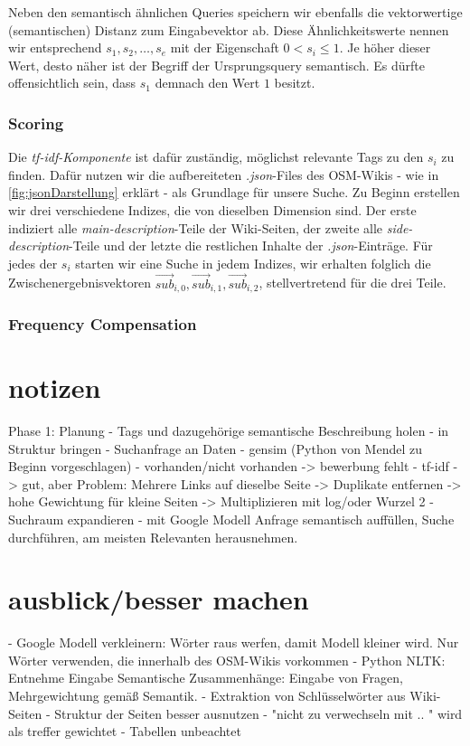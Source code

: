 \documentclass[12pt,pdftex,a4paper]{article}
\begin{document}
Neben den semantisch ähnlichen Queries speichern wir ebenfalls die vektorwertige (semantischen) Distanz zum Eingabevektor ab. Diese Ähnlichkeitswerte nennen wir entsprechend  $s_1, s_2, \dots, s_e$ mit der Eigenschaft $0 < s_i \leq 1$. Je höher dieser Wert, desto näher ist der Begriff der Ursprungsquery semantisch. Es dürfte offensichtlich sein, dass $s_1$ demnach den Wert $1$ besitzt.

\subsubsection{Scoring}
Die \textit{tf-idf-Komponente} ist dafür zuständig, möglichst relevante Tags zu den $s_i$ zu finden. Dafür nutzen wir die aufbereiteten \textit{.json}-Files des OSM-Wikis -  wie in \autoref{fig:jsonDarstellung} erklärt - als Grundlage für unsere Suche.
Zu Beginn erstellen wir drei verschiedene Indizes, die von dieselben Dimension sind. Der erste indiziert alle \textit{main-description}-Teile der Wiki-Seiten, der zweite alle \textit{side-description}-Teile und der letzte die restlichen Inhalte der \textit{.json}-Einträge. 
Für jedes der $s_i$ starten wir eine Suche in jedem Indizes, wir erhalten folglich die Zwischenergebnisvektoren $\vec{sub}_{i,0}, \vec{sub}_{i,1}, \vec{sub}_{i,2}$, stellvertretend für die drei Teile.

\subsubsection{Frequency Compensation}

\section{notizen}
Phase 1: Planung
- Tags und dazugehörige semantische Beschreibung holen
- in Struktur bringen
- Suchanfrage an Daten 
    - gensim (Python von Mendel zu Beginn vorgeschlagen)
	- vorhanden/nicht vorhanden 
		-> bewerbung fehlt
	- tf-idf
		-> gut, aber Problem: Mehrere Links auf dieselbe Seite
			-> Duplikate entfernen
		-> hohe Gewichtung für kleine Seiten
			-> Multiplizieren mit log/oder Wurzel 2
- Suchraum expandieren
	- mit Google Modell Anfrage semantisch auffüllen, Suche durchführen, am meisten Relevanten herausnehmen.

\section{ausblick/besser machen}
- Google Modell verkleinern: Wörter raus werfen, damit Modell kleiner wird. Nur Wörter verwenden, die innerhalb des OSM-Wikis vorkommen
- Python NLTK: Entnehme Eingabe Semantische Zusammenhänge: Eingabe von Fragen, Mehrgewichtung gemäß Semantik.
- Extraktion von Schlüsselwörter aus Wiki-Seiten
- Struktur der Seiten besser ausnutzen
	- "nicht zu verwechseln mit .. " wird als treffer gewichtet
	- Tabellen unbeachtet
\end{document}
